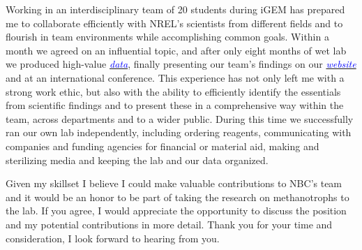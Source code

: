 \documentclass[11pt,a4paper,sans]{moderncv}
\begin{document}
\begin{spacing}{1.15}
Working in an interdisciplinary team of 20 students during iGEM has prepared me to collaborate efficiently with NREL's scientists from different fields and to flourish in team environments while accomplishing common goals.
Within a month we agreed on an influential topic, and after only eight months of wet lab we produced high-value  {\href{https://www.ncbi.nlm.nih.gov/pubmed/29803867}{\textcolor{blue}{\textit{data}}}}, finally presenting our team's findings on our {\href{http://2015.igem.org/Team:Freiburg}{\textcolor{blue}{\textit{website}}}} and at an international conference. 
This experience has not only left me with a strong work ethic, but also with the ability to efficiently identify the essentials from scientific findings and to present these in a comprehensive way within the team, across departments and to a wider public.
During this time we successfully ran our own lab independently, including ordering reagents, communicating with companies and funding agencies for financial or material aid, making and sterilizing media and keeping the lab and our data organized. \par

Given my skillset I believe I could make valuable contributions to NBC's team and it would be an honor to be part of taking the research on methanotrophs to the lab. 
If you agree, I would appreciate the opportunity to discuss the position and my potential contributions in more detail.
Thank you for your time and consideration, I look forward to hearing from you. 

\end{spacing}
\makeletterclosing
\end{document}
